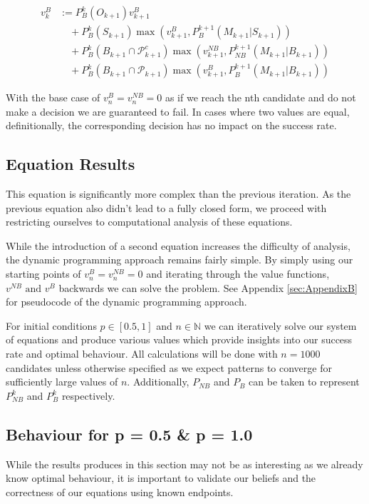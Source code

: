 \documentclass[a4paper,11pt]{article}
\begin{document}
\begin{align*}
v_k^{B} &:= P_{B}^k(O_{k+1}) v_{k+1}^{B} \\
      &\quad + P_{B}^k(S_{k+1})\max\left(v_{k+1}^{B},P_{B}^{k+1}(M_{k+1}|S_{k+1})\right) \\
      &\quad + P_{B}^k(B_{k+1} \cap \mathcal{P}_{k+1}^c)\max\left(v_{k+1}^{NB},P_{NB}^{k+1}(M_{k+1}|B_{k+1})\right) \\
      &\quad + P_{B}^k(B_{k+1} \cap \mathcal{P}_{k+1})\max\left(v_{k+1}^{B},P_{B}^{k+1}(M_{k+1}|B_{k+1})\right)
\end{align*}


With the base case of $v_{n}^{B} = v_{n}^{NB} = 0$ as if we reach the nth candidate and do not make a decision we are guaranteed to fail. In cases where two values are equal, definitionally, the corresponding decision has no impact on the success rate.


\subsection{Equation Results}
\label{sec:Equation-Results}
This equation is significantly more complex than the previous iteration. As the previous equation also didn't lead to a fully closed form, we proceed with restricting ourselves to computational analysis of these equations.

While the introduction of a second equation increases the difficulty of analysis, the dynamic programming approach remains fairly simple. By simply using our starting points of $v_{n}^{B} = v_{n}^{NB} = 0$ and iterating through the value functions, $v^{NB} \text{ and } v^B$ backwards we can solve the problem. See Appendix \ref{sec:AppendixB} for pseudocode of the dynamic programming approach.

For initial conditions $p \in [0.5,1]$ and $n \in \mathbb{N}$ we can iteratively solve our system of equations and produce various values which provide insights into our success rate and optimal behaviour. All calculations will be done with $n=1000$ candidates unless otherwise specified as we expect patterns to converge for sufficiently large values of $n$. Additionally, $P_{NB}$ and $P_B$ can be taken to represent $P_{NB}^k$ and $P_B^{k}$ respectively.

\subsection{Behaviour for p = 0.5 \& p = 1.0}

While the results produces in this section may not be as interesting as we already know optimal behaviour, it is important to validate our beliefs and the correctness of our equations using known endpoints.
\end{document}
